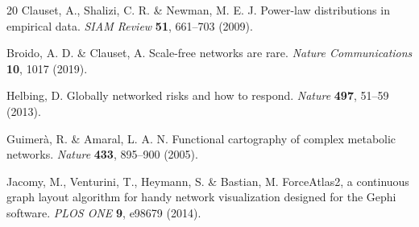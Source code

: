 \documentclass[fleqn,10pt]{wlscirep}
\begin{document}
\begin{thebibliography}{20}
Clauset, A., Shalizi, C. R. \& Newman, M. E. J.
Power-law distributions in empirical data.
\emph{SIAM Review} \textbf{51}, 661--703 (2009).

Broido, A. D. \& Clauset, A.
Scale-free networks are rare.
\emph{Nature Communications} \textbf{10}, 1017 (2019).

Helbing, D.
Globally networked risks and how to respond.
\emph{Nature} \textbf{497}, 51--59 (2013).

Guimer\`a, R. \& Amaral, L. A. N.
Functional cartography of complex metabolic networks.
\emph{Nature} \textbf{433}, 895--900 (2005).

Jacomy, M., Venturini, T., Heymann, S. \& Bastian, M.
ForceAtlas2, a continuous graph layout algorithm for handy network visualization designed for the Gephi software.
\emph{PLOS ONE} \textbf{9}, e98679 (2014).

\end{thebibliography}
\end{document}
